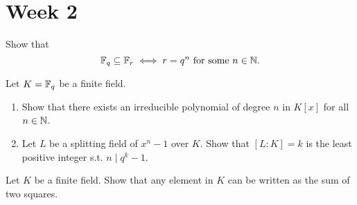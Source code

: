 
\section{Week 2}

\begin{exercise}
  Show that
  \[ \mathbb{F}_q \subseteq \mathbb{F}_r \iff r = q^n \text{ for some } n \in \mathbb{N}. \]
\end{exercise}

\begin{exercise}
  Let $K = \mathbb{F}_q$ be a finite field.
  \begin{enumerate}
    \item Show that there exists an irreducible polynomial of degree $n$
      in $K[x]$ for all $n \in \mathbb{N}$.
    \item Let $L$ be a splitting field of $x^n - 1$ over $K$. Show that
      $[L : K] = k$ is the least positive integer s.t. $n \mid q^k - 1$.
  \end{enumerate}
\end{exercise}

\begin{exercise}
  Let $K$ be a finite field. Show that any element in $K$ can be written
  as the sum of two squares.
\end{exercise}
